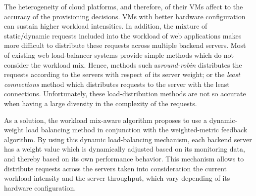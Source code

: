 The heterogeneity of cloud platforms, and therefore, of their VMs affect to the accuracy of the provisioning decisions. VMs with better hardware configuration can sustain higher workload intensities. In addition, the mixture of static/dynamic requests included into the workload of web applications makes more difficult to distribute these requests across multiple backend servers. Most of existing web load-balancer systems provide simple methods which do not consider the workload mix. Hence, methods such as\emph{round-robin} distributes the requests according to the servers with respect of its server weight; or the \emph{least connections} method which distributes requests to the server with the least connections. Unfortunately, these load-distribution methods are not so accurate when having a large diversity in the complexity of the requests. 

As a solution, the workload mix-aware algorithm proposes to use a dynamic-weight load balancing method in conjunction with the weighted-metric feedback algorithm. By using this dynamic load-balancing mechanism, each backend server has a weight value which is dynamically adjusted based on its monitoring data, and thereby based on its own performance behavior. This mechanism allows to distribute requests across the servers taken into consideration the current workload intensity and the server throughput, which vary depending of its hardware configuration.


